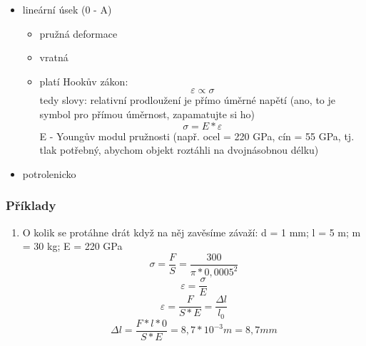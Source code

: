 \documentclass{article}
\begin{document}
      \begin{itemize}
        \item lineární úsek (0 - A)
        \begin{itemize}
          \item pružná deformace
          \item vratná
          \item platí Hookův zákon:
            \begin{equation*}
              \varepsilon \propto \sigma
            \end{equation*}
          tedy slovy: relativní prodloužení je přímo úměrné napětí (ano, to je symbol pro přímou úměrnost, zapamatujte si ho)
            \begin{equation*}
              \sigma = E*\varepsilon
            \end{equation*}
          E - Youngův modul pružnosti (např. ocel = 220 GPa, cín = 55 GPa, tj. tlak potřebný, abychom objekt roztáhli na dvojnásobnou délku)
        \end{itemize}
        \item potrolenicko
      \end{itemize}
      
        \subsubsection{Příklady}
        \begin{enumerate}
          \item O kolik se protáhne drát když na něj zavěsíme závaží:
          d = 1 mm;
          l = 5 m;
          m = 30 kg;
          E = 220 GPa
          \begin{equation*}
            \sigma=\frac{F}{S}=\frac{300}{\pi*0,0005^2}
          \end{equation*}
          \begin{equation*}
            \varepsilon = \frac{\sigma}{E}
          \end{equation*}
          \begin{equation*}
            \varepsilon = \frac{F}{S*E}=\frac{\Delta l}{l_0}
          \end{equation*}
          \begin{equation*}
            \Delta l = \frac{F*l*0}{S*E}=8,7*10^{-3} m = 8,7 mm
          \end{equation*}
        \end{enumerate}
\end{document}
